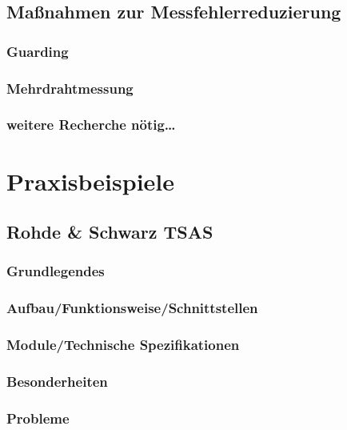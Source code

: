     \subsection{Maßnahmen zur Messfehlerreduzierung}

        \subsubsection{Guarding}


        \subsubsection{Mehrdrahtmessung}

        \subsubsection{weitere Recherche nötig\dots}

\section{Praxisbeispiele}

    \subsection{Rohde \& Schwarz TSAS}
        \subsubsection{Grundlegendes}

        \subsubsection{Aufbau/Funktionsweise/Schnittstellen}

        \subsubsection{Module/Technische Spezifikationen}

        \subsubsection{Besonderheiten}

        \subsubsection{Probleme}

